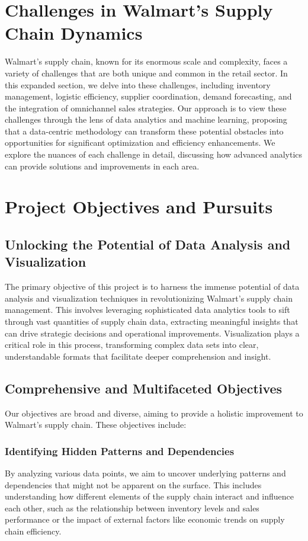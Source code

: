 \documentclass[conference]{IEEEtran}
\begin{document}
\section{Challenges in Walmart's Supply Chain Dynamics}
Walmart's supply chain, known for its enormous scale and complexity, faces a variety of challenges that are both unique and common in the retail sector. In this expanded section, we delve into these challenges, including inventory management, logistic efficiency, supplier coordination, demand forecasting, and the integration of omnichannel sales strategies. Our approach is to view these challenges through the lens of data analytics and machine learning, proposing that a data-centric methodology can transform these potential obstacles into opportunities for significant optimization and efficiency enhancements. We explore the nuances of each challenge in detail, discussing how advanced analytics can provide solutions and improvements in each area.

\section{Project Objectives and Pursuits}

\subsection{Unlocking the Potential of Data Analysis and Visualization}
The primary objective of this project is to harness the immense potential of data analysis and visualization techniques in revolutionizing Walmart's supply chain management. This involves leveraging sophisticated data analytics tools to sift through vast quantities of supply chain data, extracting meaningful insights that can drive strategic decisions and operational improvements. Visualization plays a critical role in this process, transforming complex data sets into clear, understandable formats that facilitate deeper comprehension and insight.

\subsection{Comprehensive and Multifaceted Objectives}
Our objectives are broad and diverse, aiming to provide a holistic improvement to Walmart's supply chain. These objectives include:

\subsubsection{Identifying Hidden Patterns and Dependencies}
By analyzing various data points, we aim to uncover underlying patterns and dependencies that might not be apparent on the surface. This includes understanding how different elements of the supply chain interact and influence each other, such as the relationship between inventory levels and sales performance or the impact of external factors like economic trends on supply chain efficiency.
\end{document}
